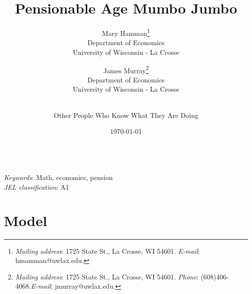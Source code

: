 \documentclass[11pt]{article}
\begin{document}
\begin{titlepage}
\begin{singlespace}
\title{Pensionable Age Mumbo Jumbo}
\date{\today}
\author{
Mary Hamman\footnote{\textit{Mailing address}: 1725 State St., La Crosse, WI  54601. \newline  \textit{E-mail}: hmamman@uwlax.edu.}\\Department of Economics\\University of Wisconsin - La Crosse
\and 
James Murray\footnote{\textit{Mailing address}: 1725 State St., La Crosse, WI  54601. \textit{Phone}: (608)406-4068.\newline  \textit{E-mail}: jmurray@uwlax.edu.}\\Department of Economics\\University of Wisconsin - La Crosse
\and \ \\
Other People Who Know What They Are Doing\\
}

\maketitle

\thispagestyle{empty}

\\

\noindent \textit{Keywords}: Math, economics, pension \\
\noindent \textit{JEL classification}: A1

\end{singlespace}
\end{titlepage}

\section{Model}
\end{document}
